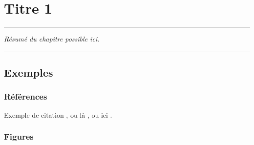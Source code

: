 
\lhead[\fancyplain{}{\leftmark}]%
      {\fancyplain{}{}} %
\chead[\fancyplain{}{}]%
      {\fancyplain{}{}}
\rhead[\fancyplain{}{}]%
      {\fancyplain{}{\rightmark}}%
\lfoot[\fancyplain{}{}]%
      {\fancyplain{}{}}
\cfoot[\fancyplain{}{\thepage}]%
      {\fancyplain{}{\thepage}} %
\rfoot[\fancyplain{}{}]%
     {\fancyplain{}{\scriptsize}}



\chapter{Titre 1}
\label{ch:1}


\begin{center}
\rule{0.7\linewidth}{.5pt}
\begin{minipage}{0.7\linewidth}
\smallskip

\textit{Résumé du chapitre possible ici.
}

\end{minipage}
\smallskip
\rule{0.7\linewidth}{.5pt}
\end{center}

\minitoc
\newpage


\section{Exemples}
\subsection{Références}

Exemple de citation \cite{Collomb2017}, ou là \cite{Collomb2018b}, ou ici \cite{Collomb2018a,Collomb2017a,Collomb2018}. \\


\FloatBarrier
\subsection{Figures}

